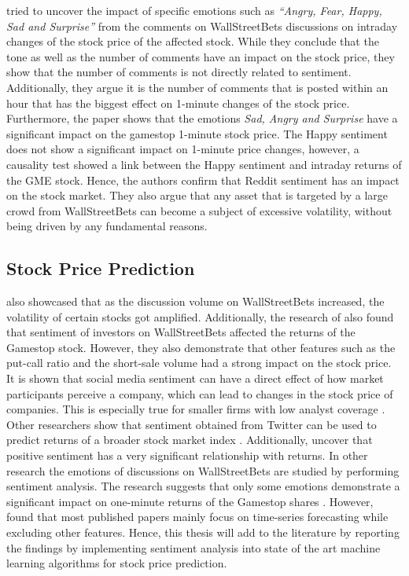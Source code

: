 \documentclass[11pt, a4paper]{article}
\begin{document}
\cite{long2021LikeTheStock} tried to uncover the impact of specific emotions such as \emph{“Angry, Fear, Happy, Sad and Surprise”} from the comments on 
WallStreetBets discussions on intraday changes of the stock price of the affected stock. While they conclude that the tone as well as the number of 
comments have an impact on the stock price, they show that the number of comments is not directly related to sentiment. Additionally, they argue it 
is the number of comments that is posted within an hour that has the biggest effect on 1-minute changes of the stock price. Furthermore, the paper 
shows that the emotions \emph{Sad, Angry and Surprise} have a significant impact on the gamestop 1-minute stock price. The Happy sentiment does not show a 
significant impact on 1-minute price changes, however, a causality test showed a link between the Happy sentiment and intraday returns of the GME stock. 
Hence, the authors confirm that Reddit 
sentiment has an impact on the stock market. They also argue that any asset that is targeted by a large crowd from WallStreetBets can become a subject 
of excessive volatility, without being driven by any fundamental reasons.

\subsection{Stock Price Prediction}
\cite{lyocsa2021yolotrading} also showcased that as the discussion volume on WallStreetBets increased, the volatility of certain stocks got amplified. 
Additionally, the research of \cite{umar2021ataleofcompanyfundamentals} also found that sentiment of investors on WallStreetBets affected the returns of the Gamestop stock. 
However, they also demonstrate that other features such as the put-call ratio and the short-sale volume had a strong impact on the stock price. \\

It is shown that social media sentiment can have a 
direct effect of how market participants perceive a company, which can lead to changes in the stock price of companies. This is especially true for smaller 
firms with low analyst coverage \citep{feng2019824}. Other researchers show that sentiment obtained from Twitter can be used to predict returns of a 
broader stock market index \citep{gu2020twtrsentiment}.
Additionally, \cite{werner2004talknoise} uncover that positive sentiment has a very significant relationship with returns.
In other research the emotions of discussions on WallStreetBets are studied by performing sentiment analysis. 
The research suggests that only some emotions demonstrate a significant impact on one-minute returns of the Gamestop shares \citep{long2021LikeTheStock}.
However, \cite{gooijer2006forecasting} found that most published papers mainly focus on time-series forecasting while excluding other features.
Hence, this thesis will add to the literature by reporting the findings by implementing sentiment analysis into state of the art machine learning algorithms for
stock price prediction.
\end{document}
